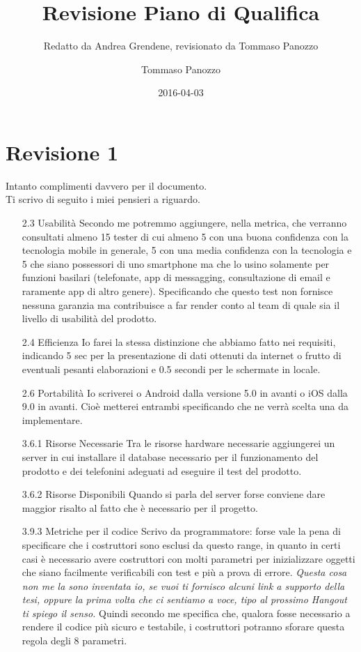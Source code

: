 \documentclass[11pt,a4paper]{article}
\author{Tommaso Panozzo}
\date{2016-04-03}
\title{Revisione Piano di Qualifica}
\subtitle{Redatto da Andrea Grendene, revisionato da Tommaso Panozzo}
\begin{document}
  \maketitle

  \section{Revisione 1}
  \label{sec:Revisione 1}

  Intanto complimenti davvero per il documento. \\
  Ti scrivo di seguito i miei pensieri a riguardo.
  \begin{itemize}
    \item [2.3 Usabilità] Secondo me potremmo aggiungere, nella metrica, che verranno consultati almeno 15 tester di cui almeno 5 con una buona confidenza con la tecnologia mobile in generale, 5 con una media confidenza con la tecnologia e 5 che siano possessori di uno smartphone ma che lo usino solamente per funzioni basilari (telefonate, app di messagging, consultazione di email e raramente app di altro genere). Specificando che questo test non fornisce nessuna garanzia ma contribuisce a far render conto al team di quale sia il livello di usabilità del prodotto.

    \item [2.4 Efficienza] Io farei la stessa distinzione che abbiamo fatto nei requisiti, indicando 5 sec per la presentazione di dati ottenuti da internet o frutto di eventuali pesanti elaborazioni e 0.5 secondi per le schermate in locale.

    \item [2.6 Portabilità] Io scriverei o Android dalla versione 5.0 in avanti o iOS dalla 9.0 in avanti. Cioè metterei entrambi specificando che ne verrà scelta una da implementare.

    \item [3.6.1 Risorse Necessarie] Tra le risorse hardware necessarie aggiungerei un server in cui installare il database necessario per il funzionamento del prodotto e dei telefonini adeguati ad eseguire il test del prodotto.

    \item [3.6.2 Risorse Disponibili] Quando si parla del server forse conviene dare maggior risalto al fatto che è necessario per il progetto.

    \item [3.9.3 Metriche per il codice] Scrivo da programmatore: forse vale la pena di specificare che i costruttori sono esclusi da questo range, in quanto in certi casi è necessario avere costruttori con molti parametri per inizializzare oggetti che siano facilmente verificabili con test e più a prova di errore. \textit{Questa cosa non me la sono inventata io, se vuoi ti fornisco alcuni link a supporto della tesi, oppure la prima volta che ci sentiamo a voce, tipo al prossimo Hangout ti spiego il senso.} Quindi secondo me specifica che, qualora fosse necessario a rendere il codice più sicuro e testabile, i costruttori potranno sforare questa regola degli 8 parametri.


\end{itemize}
\end{document}
